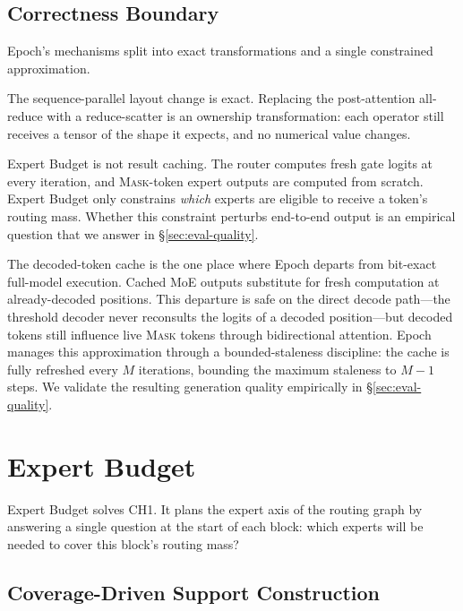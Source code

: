 \documentclass[sigconf,review,anonymous, 10pt]{acmart}
\newcommand{\sys}{Epoch}
\newcommand{\mask}{\textsc{Mask}}
\begin{document}
\subsection{Correctness Boundary}
\label{sec:correctness}

\sys{}'s mechanisms split into exact transformations and a single constrained approximation.

The sequence-parallel layout change is exact.
Replacing the post-attention all-reduce with a reduce-scatter is an ownership transformation: each operator still receives a tensor of the shape it expects, and no numerical value changes.

Expert Budget is not result caching.
The router computes fresh gate logits at every iteration, and \mask{}-token expert outputs are computed from scratch.
Expert Budget only constrains \emph{which} experts are eligible to receive a token's routing mass.
Whether this constraint perturbs end-to-end output is an empirical question that we answer in \S\ref{sec:eval-quality}.

The decoded-token cache is the one place where \sys{} departs from bit-exact full-model execution.
Cached MoE outputs substitute for fresh computation at already-decoded positions.
This departure is safe on the direct decode path---the threshold decoder never reconsults the logits of a decoded position---but decoded tokens still influence live \mask{} tokens through bidirectional attention.
\sys{} manages this approximation through a bounded-staleness discipline: the cache is fully refreshed every $M$ iterations, bounding the maximum staleness to $M{-}1$ steps.
We validate the resulting generation quality empirically in \S\ref{sec:eval-quality}.


\section{Expert Budget}
\label{sec:expert-budget}

Expert Budget solves CH1.
It plans the expert axis of the routing graph by answering a single question at the start of each block: which experts will be needed to cover this block's routing mass?

\subsection{Coverage-Driven Support Construction}
\end{document}
